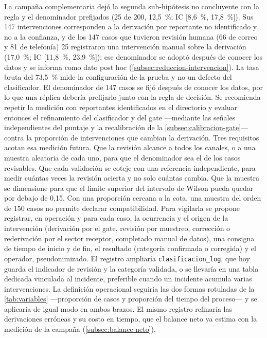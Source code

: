 La campaña complementaria dejó la segunda sub-hipótesis no concluyente con la regla y el denominador prefijados (25 de 200, 12,5~\%; IC [8,6~\%, 17,8~\%]). Sus 147 intervenciones corresponden a la derivación por reportante no identificado y no a la confianza, y de los 147 casos que tuvieron revisión humana (66 de correo y 81 de telefonía) 25 registraron una intervención manual sobre la derivación (17,0~\%; IC [11,8~\%, 23,9~\%]); ese denominador se adoptó después de conocer los datos y se informa como dato post hoc (\autoref{subsec:reduccion-intervencion}). La tasa bruta del 73,5~\% mide la configuración de la prueba y no un defecto del clasificador. El denominador de 147 casos se fijó después de conocer los datos, por lo que una réplica debería prefijarlo junto con la regla de decisión. Se recomienda repetir la medición con reportantes identificados en el directorio y evaluar entonces el refinamiento del clasificador y del gate ---mediante las señales independientes del puntaje y la recalibración de la \autoref{subsec:calibracion-gate}--- contra la proporción de intervenciones que cambian la derivación. Tres requisitos acotan esa medición futura. Que la revisión alcance a todos los canales, o a una muestra aleatoria de cada uno, para que el denominador sea el de los casos revisables. Que cada validación se coteje con una referencia independiente, para medir cuántas veces la revisión acierta y no solo cuántas cambia. Que la muestra se dimensione para que el límite superior del intervalo de Wilson pueda quedar por debajo de 0,15. Con una proporción cercana a la cota, una muestra del orden de 150 casos no permite declarar compatibilidad. Para vigilarla se propone registrar, en operación y para cada caso, la ocurrencia y el origen de la intervención (derivación por el gate, revisión por muestreo, corrección o rederivación por el sector receptor, completado manual de datos), una consigna de tiempo de inicio y de fin, el resultado (categoría confirmada o corregida) y el operador, pseudonimizado. El registro ampliaría \texttt{clasificacion\_log}, que hoy guarda el indicador de revisión y la categoría validada, o se llevaría en una tabla dedicada vinculada al incidente, preferible cuando un incidente acumula varias intervenciones. La definición operacional seguiría las dos formas rotuladas de la \autoref{tab:variables} ---proporción de casos y proporción del tiempo del proceso--- y se aplicaría de igual modo en ambos brazos. El mismo registro refinaría las derivaciones erróneas y su costo en tiempo, que el balance neto ya estima con la medición de la campaña (\autoref{subsec:balance-neto}).

